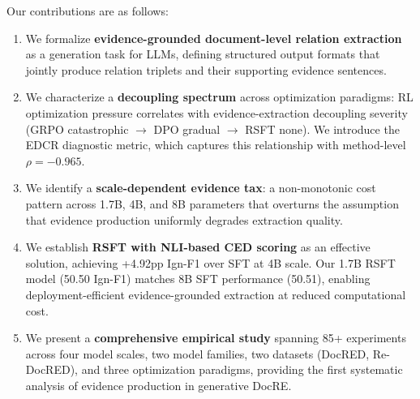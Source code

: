 Our contributions are as follows:
\begin{enumerate}
    \item We formalize \textbf{evidence-grounded document-level relation extraction} as a generation task for LLMs, defining structured output formats that jointly produce relation triplets and their supporting evidence sentences.

    \item We characterize a \textbf{decoupling spectrum} across optimization paradigms: RL optimization pressure correlates with evidence-extraction decoupling severity (GRPO catastrophic $\rightarrow$ DPO gradual $\rightarrow$ RSFT none). We introduce the EDCR diagnostic metric, which captures this relationship with method-level $\rho = -0.965$.

    \item We identify a \textbf{scale-dependent evidence tax}: a non-monotonic cost pattern across 1.7B, 4B, and 8B parameters that overturns the assumption that evidence production uniformly degrades extraction quality.

    \item We establish \textbf{RSFT with NLI-based CED scoring} as an effective solution, achieving +4.92pp Ign-F1 over SFT at 4B scale. Our 1.7B RSFT model (50.50 Ign-F1) matches 8B SFT performance (50.51), enabling deployment-efficient evidence-grounded extraction at reduced computational cost.

    \item We present a \textbf{comprehensive empirical study} spanning 85+ experiments across four model scales, two model families, two datasets (DocRED, Re-DocRED), and three optimization paradigms, providing the first systematic analysis of evidence production in generative DocRE.
\end{enumerate}
